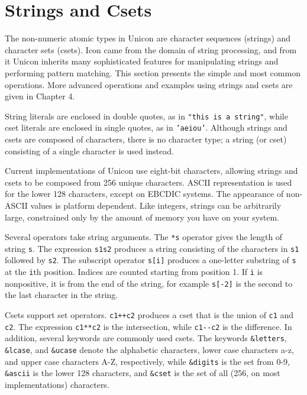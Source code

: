 \section{Strings and Csets}

The non-numeric atomic types in Unicon are character sequences
(strings) and character sets
(csets). Icon came from the domain of string
processing, and from it Unicon inherits many sophisticated features for
manipulating strings and performing pattern
matching. This section presents the simple and most common operations.
More advanced operations and examples using strings and csets are given
in Chapter 4.

String literals are enclosed in double quotes, as
in \texttt{"this is a string"}, while
cset literals are enclosed in single quotes, as in
\texttt{'aeiou'}. Although strings
and csets are composed of characters, there is no
character type; a string (or cset) consisting of a
single character is used instead.

Current implementations of Unicon use eight-bit characters, allowing
strings and csets to be composed from 256 unique characters.
ASCII representation is used for the lower 128 characters,
except on EBCDIC systems. The appearance of non-ASCII
values is platform dependent. Like integers, strings can be arbitrarily
large, constrained only by the amount of memory you have on your
system.

Several operators take string arguments. The \texttt{*s} operator gives the length
of string \texttt{s}. The expression \texttt{s1{\textbar}{\textbar}s2} produces a
string consisting of the characters in \texttt{s1} followed by
\texttt{s2}. The subscript operator
\texttt{s[i]} produces a one-letter
substring of \texttt{s} at the \texttt{i}th position.
Indices are counted starting from
position 1. If \texttt{i} is nonpositive, it is from the end of the
string, for example \texttt{s[-2]} is the second to the last character
in the string.

Csets support set operators. \texttt{c1++c2}
produces a cset that is the union of \texttt{c1} and \texttt{c2}.
The expression \texttt{c1**c2} is the
intersection, while \texttt{c1-{}-c2} is
the difference. In addition, several keywords are commonly used
csets. The keywords \texttt{\&letters},
\texttt{\&lcase}, and \texttt{\&ucase} denote the alphabetic
characters, lower case characters a-z, and
upper case characters A-Z, respectively, while
\texttt{\&digits} is the set from 0-9,
\texttt{\&ascii} is the lower 128 characters, and
\texttt{\&cset} is the set of all (256,
on most implementations) characters.

